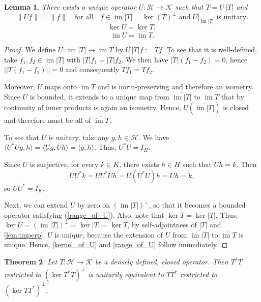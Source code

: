 \documentclass[11pt]{article}
\newtheorem{theorem}{Theorem}[section]
\newtheorem{lemma}[theorem]{Lemma}
\theoremstyle{definition}
\theoremstyle{remark}
\DeclareMathOperator{\im}{im}
\newcommand{\Hh}{\mathcal{H}}
\newcommand{\Kk}{\mathcal{K}}
\begin{document}
\begin{lemma}
    \label{lem:u}There exists a unique operator $U:\Hh \to \Kk$ such that $T=U \, |T|$ and 
    \begin{equation}\label{relation_of_U}
        \|Uf\|=\|f\|\quad \text{for all}\quad f\in\overline{\im |T|}=\ker(T)^\perp \text{ and } U|_{\overline{\im |T|}} \text{ is unitary.}
    \end{equation}
    \begin{equation}\label{kernel_of_U}
        \ker U = \ker T,
    \end{equation}
    \begin{equation}\label{range_of_U}
        \im U =\overline{\im T}.
    \end{equation}   
\end{lemma}
\begin{proof}
    We define $U:\im |T|\to\im T$ by $U\,|T|f:=Tf$. To see that it is well-defined, take $f_1,f_2 \in \im |T|$ with $|T|f_1=|T|f_2$. We then have $|T|(f_1-f_2)=0$, hence $||T(f_1-f_2)||=0$ and consequently $Tf_1=Tf_2$.
    
    Moreover, $U$ maps onto $\im T$ and is norm-preserving and therefore an isometry. Since $U$ is bounded, it extends to a unique map from $\overline{\im |T|}$ to $\overline{\im T}$ that by continuity of inner products is again an isometry. Hence, $U(\overline{\im |T|})$ is closed and therefore must be all of $\overline{\im T}$.
    
    To see that $U$ is unitary, take any $g,h \in \Hh$. We have $\langle U^*Ug, h \rangle=\langle Ug, Uh \rangle = \langle g, h \rangle$. Thus, $U^*U = I_H.$
    
    Since $U$ is surjective, for every $k \in K$, there exists $h \in H$ such that $Uh = k$. Then
    $$
    UU^* k = UU^* Uh = U (U^* U)h = U h = k,
    $$
    so $UU^* = I_K$.
    
    Next, we can extend $U$ by zero on $(\im |T|)^\perp$, so that it becomes a bounded operator satisfying (\ref{range_of_U}). Also, note that $\ker T=\ker |T|$. Thus, $\ker U=(\im|T|)^\perp=\ker |T|=\ker T$, by self-adjointness of $|T|$ and \cref{lem:imperp}. $U$ is unique, because the extension of $U$ from $\overline{\im |T|}$ to $\overline{\im T}$ is unique. Hence, \eqref{kernel_of_U} and \eqref{range_of_U} follow immediately. 
\end{proof}

\begin{theorem}
    \label{TT^*=T^*T} Let $T:\mathcal{H}\to\mathcal{K}$ be a densely defined, closed operator. Then $T^*T$ restricted to $(\ker T^*T)^\perp$ is unitarily equivalent to $TT^*$ restricted to $(\ker TT^*)^\perp$.
\end{theorem}
\end{document}
